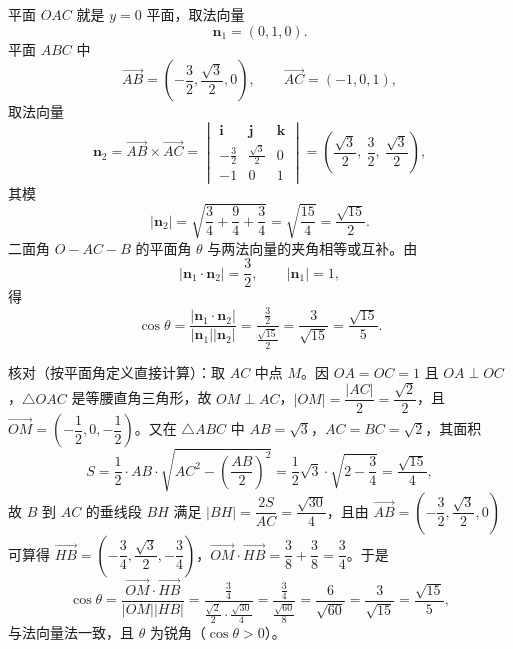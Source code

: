 \begin{answer}
平面 $OAC$ 就是 $y=0$ 平面，取法向量
\nopagebreak[4]
\[\boldsymbol n_1=(0,1,0).\]
平面 $ABC$ 中
\nopagebreak[4]
\[\overrightarrow{AB}=\left(-\frac32,\frac{\sqrt3}{2},0\right),\qquad \overrightarrow{AC}=(-1,0,1),\]
取法向量
\nopagebreak[4]
\[\boldsymbol n_2=\overrightarrow{AB}\times\overrightarrow{AC}=
\begin{vmatrix}
\boldsymbol i&\boldsymbol j&\boldsymbol k\\
-\frac32&\frac{\sqrt3}{2}&0\\
-1&0&1
\end{vmatrix}
=\left(\frac{\sqrt3}{2},\ \frac32,\ \frac{\sqrt3}{2}\right),\]
其模
\nopagebreak[4]
\[|\boldsymbol n_2|=\sqrt{\frac34+\frac94+\frac34}=\sqrt{\frac{15}{4}}=\frac{\sqrt{15}}{2}.\]
二面角 $O-AC-B$ 的平面角 $\theta$ 与两法向量的夹角相等或互补。由
\nopagebreak[4]
\[|\boldsymbol n_1\cdot\boldsymbol n_2|=\frac32,\qquad |\boldsymbol n_1|=1,\]
得
\nopagebreak[4]
\[\cos\theta=\frac{\left|\boldsymbol n_1\cdot\boldsymbol n_2\right|}{|\boldsymbol n_1||\boldsymbol n_2|}=\frac{\frac32}{\frac{\sqrt{15}}{2}}=\frac{3}{\sqrt{15}}=\frac{\sqrt{15}}{5}.\]

核对（按平面角定义直接计算）：取 $AC$ 中点 $M$。因 $OA=OC=1$ 且 $OA\perp OC$，$\triangle OAC$ 是等腰直角三角形，故 $OM\perp AC$，$|OM|=\dfrac{|AC|}{2}=\dfrac{\sqrt2}{2}$，且 $\overrightarrow{OM}=\left(-\dfrac12,0,-\dfrac12\right)$。又在 $\triangle ABC$ 中 $AB=\sqrt3$，$AC=BC=\sqrt2$，其面积
\nopagebreak[4]
\[S=\frac12\cdot AB\cdot\sqrt{AC^2-\left(\frac{AB}{2}\right)^2}=\frac12\sqrt3\cdot\sqrt{2-\frac34}=\frac{\sqrt{15}}{4},\]
故 $B$ 到 $AC$ 的垂线段 $BH$ 满足 $|BH|=\dfrac{2S}{AC}=\dfrac{\sqrt{30}}{4}$，且由 $\overrightarrow{AB}=\left(-\dfrac32,\dfrac{\sqrt3}{2},0\right)$ 可算得 $\overrightarrow{HB}=\left(-\dfrac34,\dfrac{\sqrt3}{2},-\dfrac34\right)$，$\overrightarrow{OM}\cdot\overrightarrow{HB}=\dfrac38+\dfrac38=\dfrac34$。于是
\nopagebreak[4]
\[\cos\theta=\frac{\overrightarrow{OM}\cdot\overrightarrow{HB}}{|OM||HB|}=\frac{\frac34}{\frac{\sqrt2}{2}\cdot\frac{\sqrt{30}}{4}}=\frac{\frac34}{\frac{\sqrt{60}}{8}}=\frac{6}{\sqrt{60}}=\frac{3}{\sqrt{15}}=\frac{\sqrt{15}}{5},\]
与法向量法一致，且 $\theta$ 为锐角（$\cos\theta>0$）。


\end{answer}
